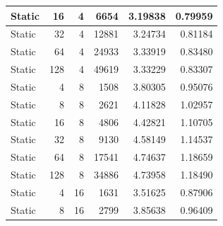 \documentclass[journal,transmag]{IEEEtran}
\begin{document}
\begin{table}[h!]
\begin{tabular}{|l|r|r|r|r|r|}
		Static        & 16                           & 4                            & 6654                              & 3.19838                       & 0.79959                         \\ \hline
		Static        & 32                           & 4                            & 12881                             & 3.24734                       & 0.81184                         \\ \hline
		Static        & 64                           & 4                            & 24933                             & 3.33919                       & 0.83480                         \\ \hline
		Static        & 128                          & 4                            & 49619                             & 3.33229                       & 0.83307                         \\ \hline
		Static        & 4                            & 8                            & 1508                              & 3.80305                       & 0.95076                         \\ \hline
		Static        & 8                            & 8                            & 2621                              & 4.11828                       & 1.02957                         \\ \hline
		Static        & 16                           & 8                            & 4806                              & 4.42821                       & 1.10705                         \\ \hline
		Static        & 32                           & 8                            & 9130                              & 4.58149                       & 1.14537                         \\ \hline
		Static        & 64                           & 8                            & 17541                             & 4.74637                       & 1.18659                         \\ \hline
		Static        & 128                          & 8                            & 34886                             & 4.73958                       & 1.18490                         \\ \hline
		Static        & 4                            & 16                           & 1631                              & 3.51625                       & 0.87906                         \\ \hline
		Static        & 8                            & 16                           & 2799                              & 3.85638                       & 0.96409                         \\ \hline

\end{tabular}
\end{table}
\end{document}

